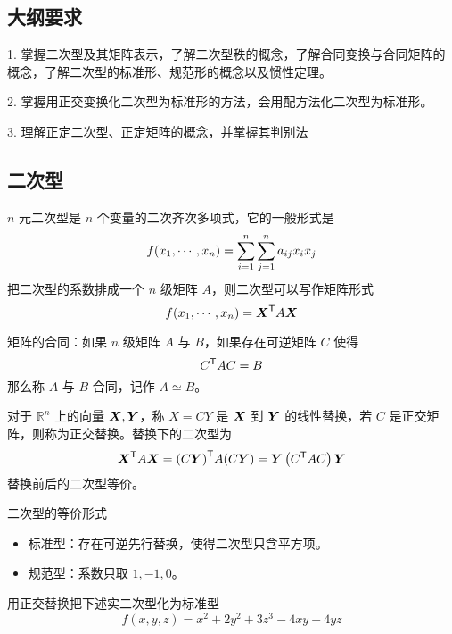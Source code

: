 \subsection{大纲要求}

1. 掌握二次型及其矩阵表示，了解二次型秩的概念，了解合同变换与合同矩阵的概念，了解二次型的标准形、规范形的概念以及惯性定理。

2. 掌握用正交变换化二次型为标准形的方法，会用配方法化二次型为标准形。

3. 理解正定二次型、正定矩阵的概念，并掌握其判别法

\subsection{二次型}

\newcommand{\XAX}{\transpose{\vbf{X}}A\vbf{X}}

\begin{definition}[二次型]
	$n$ 元二次型是 $n$ 个变量的二次齐次多项式，它的一般形式是
	\[f(x_1,\cdots,x_n) = \sum_{i=1}^n\sum_{j=1}^na_{ij}x_ix_j\]
	把二次型的系数排成一个 $n$ 级矩阵 $A$，则二次型可以写作矩阵形式
	\[f(\seq{x}{n}) = \XAX\]
\end{definition}

矩阵的合同：如果 $n$ 级矩阵 $A$ 与 $B$，如果存在可逆矩阵 $C$ 使得
\[ {C}^\mathsf{T}AC = B \]
那么称 $A$ 与 $B$ 合同，记作 $A\simeq B$。

对于 $\mathbb{R}^n$ 上的向量 $\boldsymbol{X}, \boldsymbol{Y}$，称 $X = CY$ 是 $\boldsymbol{X}$ 到 $\boldsymbol{Y}$ 的线性替换，若 $C$ 是正交矩阵，则称为正交替换。替换下的二次型为
\[ \XAX = \transpose{(C\vbf{Y})} A (C\vbf{Y}) = \vbf{Y}\left(\transpose{C} A C\right)\vbf{Y} \]
替换前后的二次型等价。

二次型的等价形式
\begin{itemize}
	\item 标准型：存在可逆先行替换，使得二次型只含平方项。
	\item 规范型：系数只取 $1,-1,0$。
\end{itemize}

\begin{example}
	用正交替换把下述实二次型化为标准型
	\[ f(x, y, z) = x^2 + 2y^2 + 3z^3 - 4xy - 4yz \]
\end{example}

